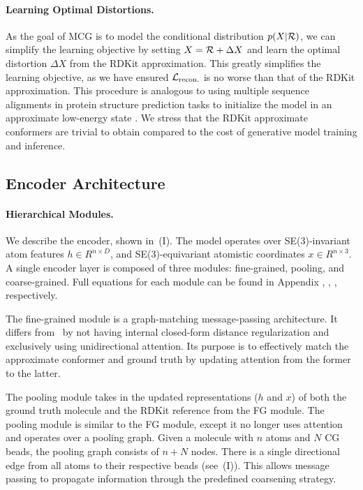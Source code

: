\vspace{-1ex}
\paragraph{Learning Optimal Distortions.} As the goal of MCG is to model the conditional distribution $p(X | {\mathcal{R}})$, we can simplify the learning objective by setting $X = {\mathcal{R}} + \Delta X$ and learn the optimal distortion $\Delta X$ from the RDKit approximation. 
This greatly simplifies the learning objective, as we have ensured ${\mathcal{L}}_{\text{recon.}}$ is no worse than that of the RDKit approximation.
This procedure is analogous to using multiple sequence alignments in protein structure prediction tasks to initialize the model in an approximate low-energy state \citep{alphafold}. We stress that the RDKit approximate conformers are trivial to obtain compared to the cost of generative model training and inference. 

\vspace{-1ex}
\subsection{Encoder Architecture}
\label{section:hierarchy}
\paragraph{Hierarchical Modules.} We describe the encoder, shown in~(I). The model operates over SE(3)-invariant atom features $h \in R^{n\times D}$, and SE(3)-equivariant atomistic coordinates $x \in R^{n\times3}$. A single encoder layer is composed of three modules: fine-grained, pooling, and coarse-grained. Full equations for each module can be found in Appendix , , , respectively.

The fine-grained module is a graph-matching message-passing architecture. It differs from~\citet{equibind} by not having internal closed-form distance regularization and exclusively using unidirectional attention. Its purpose is to effectively match the approximate conformer and ground truth by updating attention from the former to the latter.

The pooling module takes in the updated representations ($h$ and $x$) of both the ground truth molecule and the RDKit reference from the FG module.
The pooling module is similar to the FG module, except it no longer uses attention and operates over a pooling graph.
Given a molecule with $n$ atoms and $N$ CG beads, the pooling graph consists of $n + N$ nodes. There is a single directional edge from all atoms to their respective beads (see~(I)). This allows message passing to propagate information through the predefined coarsening strategy.

